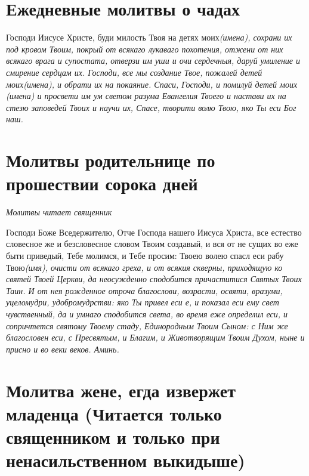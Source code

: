 \section{Ежедневные молитвы о чадах}
 


Господи Иисусе Христе, буди милость Твоя на детях моих\itshape  (имена)\normalfont{}, сохрани их под кровом Твоим, покрый от всякаго лукаваго похотения, отжени от них всякаго врага и супостата, отверзи им уши и очи сердечныя, даруй умиление и смирение сердцам их. Господи, все мы создание Твое, пожалей детей моих\itshape  (имена)\normalfont{}, и обрати их на покаяние. Спаси, Господи, и помилуй детей мои\itshape х (имена\normalfont{}) и просвети им ум светом разума Евангелия Твоего и настави их на стезю заповедей Твоих и научи их, Спасе, творити волю Твою, яко Ты еси Бог наш. 


\section{Молитвы родительнице по прошествии сорока дней}
 


\itshape Молитвы читает священник\normalfont{}

Господи Боже Вседержителю, Отче Господа нашего Иисуса Христа, все естество словесное же и безсловесное словом Твоим создавый, и вся от не сущих во еже быти приведый, Тебе молимся, и Тебе просим: Твоею волею спасл еси рабу Твою\itshape  (имя\normalfont{}), очисти от всякаго греха, и от всякия скверны, приходящую ко святей Твоей Церкви, да неосужденно сподобится причаститися Святых Твоих Таин. И от нея рожденное отроча благослови, возрасти, освяти, вразуми, уцеломудри, удобромудрстви: яко Ты привел еси е, и показал еси ему свет чувственный, да и умнаго сподобится света, во время еже определил еси, и сопричтется святому Твоему стаду, Единородным Твоим Сыном: с Ним же благословен еси, с Пресвятым, и Благим, и Животворящим Твоим Духом, ныне и присно и во веки веков. Аминь. 





\bigskip\bigskip\mychapterending


 

\section{Молитва жене, егда извержет младенца (Читается только священником и только при ненасильственном выкидыше)}
 


